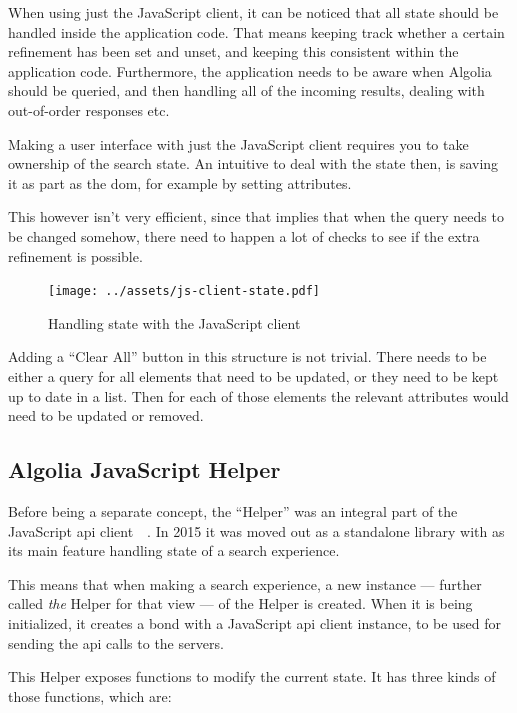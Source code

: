 When using just the JavaScript client, it can be noticed that all state should be handled inside the application code. That means keeping track whether a certain refinement has been set and unset, and keeping this consistent within the application code. Furthermore, the application needs to be aware when Algolia should be queried, and then handling all of the incoming results, dealing with out-of-order responses etc.

Making a user interface with just the JavaScript client requires you to take ownership of the search state. An intuitive to deal with the state then, is saving it as part as the \acrshort{dom}, for example by setting attributes.

This however isn't very efficient, since that implies that when the query needs to be changed somehow, there need to happen a lot of checks to see if the extra refinement is possible.

\begin{figure}[H]
  \centering
  \texttt{[image: ../assets/js-client-state.pdf]}
  \caption{Handling state with the JavaScript client}
  \label{figure:js-client-state}
\end{figure}

Adding a ``Clear All'' button in this structure is not trivial. There needs to be either a query for all elements that need to be updated, or they need to be kept up to date in a list. Then for each of those elements the relevant attributes would need to be updated or removed.


\subsection{Algolia JavaScript Helper} %
\label{sub:algolia_js_helper}

Before being a separate concept, the ``Helper'' was an integral part of the JavaScript \acrshort{api} client~\cite{algolia-blog-js-client}~. In 2015 it was moved out as a standalone \gls{library} with as its main feature handling state of a search experience.

This means that when making a search experience, a new instance --- further called \emph{the} Helper for that view --- of the Helper is created. When it is being initialized, it creates a bond with a JavaScript \acrshort{api} client instance, to be used for sending the \acrshort{api} calls to the servers.

This Helper exposes functions to modify the current state. It has three kinds of those functions, which are:

